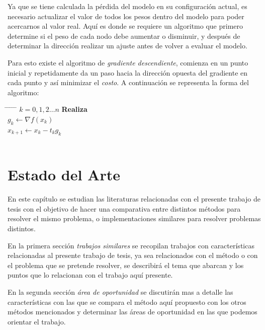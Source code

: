 Ya que se tiene calculada la pérdida del modelo en su configuración actual, es necesario actualizar el valor de todos los pesos dentro del modelo para poder acercarnos al valor real. Aquí es donde se requiere un algoritmo que primero determine si el peso de cada nodo debe aumentar o disminuir, y después de determinar la dirección realizar un ajuste antes de volver a evaluar el modelo.

Para esto existe el algoritmo de \emph{gradiente descendiente}, comienza en un punto inicial y repetidamente da un paso hacia la dirección opuesta del gradiente en cada punto y así minimizar el \emph{costo}. A continuación se representa la forma del algoritmo:

\begin{tabbing}
    \hspace*{1.5in} \= \hspace*{0.7in} \= \hspace*{.25in} \= \hspace*{.25in} \= \hspace*{.25in} \=\kill
     $k=0,1,2 \dots n$ {\bf Realiza } \\
    \>\> $g_k \leftarrow \nabla f(x_k)$ \\
    \>\> $x_{k+1} \leftarrow x_k - t_k g_k$ \\
     \\
\end{tabbing}


\chapter{Estado del Arte}
En este capítulo se estudian las literaturas relacionadas con el presente trabajo de tesis con el objetivo de hacer una comparativa entre distintos métodos para resolver el mismo problema, o implementaciones similares para resolver problemas distintos.

En la primera sección \emph{trabajos similares} se recopilan trabajos con características relacionadas al presente trabajo de tesis, ya sea relacionados con el método o con el problema que se pretende resolver, se describirá el tema que abarcan y los puntos que lo relacionan con el trabajo aquí presente. 

En la segunda sección \emph{área de oportunidad} se discutirán mas a detalle las características con las que se compara el método aquí propuesto con los otros métodos mencionados y determinar las áreas de oportunidad en las que podemos orientar el trabajo.

